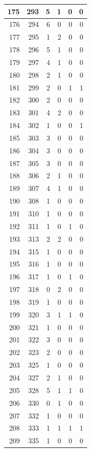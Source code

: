 \documentclass[
  letterpaper,
  DIV=11,
  numbers=noendperiod]{scrreprt}
\begin{document}
\begin{tabular}{r|r|r|r|r|r}
\hline
175 & 293 & 5 & 1 & 0 & 0\\
\hline
176 & 294 & 6 & 0 & 0 & 0\\
\hline
177 & 295 & 1 & 2 & 0 & 0\\
\hline
178 & 296 & 5 & 1 & 0 & 0\\
\hline
179 & 297 & 4 & 1 & 0 & 0\\
\hline
180 & 298 & 2 & 1 & 0 & 0\\
\hline
181 & 299 & 2 & 0 & 1 & 1\\
\hline
182 & 300 & 2 & 0 & 0 & 0\\
\hline
183 & 301 & 4 & 2 & 0 & 0\\
\hline
184 & 302 & 1 & 0 & 0 & 1\\
\hline
185 & 303 & 3 & 0 & 0 & 0\\
\hline
186 & 304 & 3 & 0 & 0 & 0\\
\hline
187 & 305 & 3 & 0 & 0 & 0\\
\hline
188 & 306 & 2 & 1 & 0 & 0\\
\hline
189 & 307 & 4 & 1 & 0 & 0\\
\hline
190 & 308 & 1 & 0 & 0 & 0\\
\hline
191 & 310 & 1 & 0 & 0 & 0\\
\hline
192 & 311 & 1 & 0 & 1 & 0\\
\hline
193 & 313 & 2 & 2 & 0 & 0\\
\hline
194 & 315 & 1 & 0 & 0 & 0\\
\hline
195 & 316 & 1 & 0 & 0 & 0\\
\hline
196 & 317 & 1 & 0 & 1 & 0\\
\hline
197 & 318 & 0 & 2 & 0 & 0\\
\hline
198 & 319 & 1 & 0 & 0 & 0\\
\hline
199 & 320 & 3 & 1 & 1 & 0\\
\hline
200 & 321 & 1 & 0 & 0 & 0\\
\hline
201 & 322 & 3 & 0 & 0 & 0\\
\hline
202 & 323 & 2 & 0 & 0 & 0\\
\hline
203 & 325 & 1 & 0 & 0 & 0\\
\hline
204 & 327 & 2 & 1 & 0 & 0\\
\hline
205 & 328 & 5 & 1 & 1 & 0\\
\hline
206 & 330 & 0 & 1 & 0 & 0\\
\hline
207 & 332 & 1 & 0 & 0 & 0\\
\hline
208 & 333 & 1 & 1 & 1 & 1\\
\hline
209 & 335 & 1 & 0 & 0 & 0\\

\end{tabular}
\end{document}
